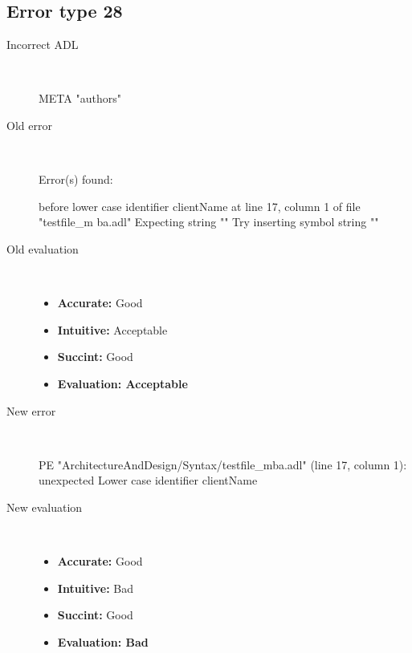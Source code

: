 \hrulefill

\subsection{Error type 28}
  \begin{description}
  \item[Incorrect ADL]~\\
\begin{adl}
META "authors" \end{adl}
  \item[Old error]~\\
\begin{haskell}
Error(s) found:

before lower case identifier clientName at line 17, column 1 of file "testfile_m
ba.adl"
Expecting string ""
Try inserting symbol string ""
\end{haskell}
  \item[Old evaluation]~\\
    \begin{itemize}
    \item \textbf{Accurate:} Good
    \item \textbf{Intuitive:} Acceptable
    \item \textbf{Succint:} Good
    \item \textbf{Evaluation: Acceptable}
    \end{itemize}
  \item[New error]~\\
\begin{haskell}
PE "ArchitectureAndDesign/Syntax/testfile_mba.adl" (line 17, column 1):
unexpected Lower case identifier clientName\end{haskell}
  \item[New evaluation]~\\
    \begin{itemize}
    \item \textbf{Accurate:} Good
    \item \textbf{Intuitive:} Bad
    \item \textbf{Succint:} Good
    \item \textbf{Evaluation: Bad
}
    \end{itemize}
  \end{description}

\hrulefill

